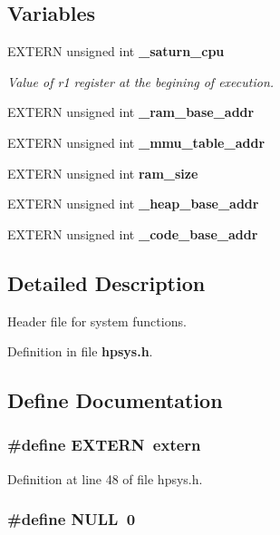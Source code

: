 \subsection*{Variables}
\begin{CompactItemize}
\item 
EXTERN unsigned int {\bf \_\-saturn\_\-cpu}
\begin{CompactList}\small\item\em Value of r1 register at the begining of execution.\item\end{CompactList}\item 
EXTERN unsigned int {\bf \_\-ram\_\-base\_\-addr}
\item 
EXTERN unsigned int {\bf \_\-mmu\_\-table\_\-addr}
\item 
EXTERN unsigned int {\bf ram\_\-size}
\item 
EXTERN unsigned int {\bf \_\-heap\_\-base\_\-addr}
\item 
EXTERN unsigned int {\bf \_\-code\_\-base\_\-addr}
\end{CompactItemize}


\subsection{Detailed Description}
Header file for system functions.





Definition in file {\bf hpsys.h}.

\subsection{Define Documentation}
\subsubsection{\setlength{\rightskip}{0pt plus 5cm}\#define EXTERN\ extern}\label{hpsys_8h_a0}




Definition at line 48 of file hpsys.h.
\subsubsection{\setlength{\rightskip}{0pt plus 5cm}\#define NULL\ 0}\label{hpsys_8h_a1}




